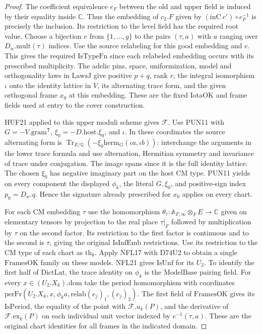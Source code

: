 \begin{proof}
The coefficient equivalence $e_F$ between the old and upper field
is induced by their equality inside $\mathbb C$. Thus the embedding
of $c_2.F$ given by $(\mathrm{inC}\ c')\circ e_F^{-1}$ is precisely
the inclusion. Its restriction to the level field has the required
root value. Choose a bijection $e$ from $\{1,\ldots,g\}$ to the
pairs $(\tau,a)$ with $a$ ranging over $D_w.\mathrm{mult}(\tau)$
indices. Use the source relabeling for this good embedding and $e$. This gives
the required $\mathrm{IsTypeFn}$ since each relabeled embedding
occurs with its prescribed multiplicity.
The adelic pins, space, uniformization, model and orthogonality laws in $\mathrm{LawsJ}$ give positive
$p+q$, rank $r$, the integral isomorphism $\iota$ onto the identity
lattice in $V$, its alternating trace form, and the given orthogonal
frame $x_0$ at this embedding. These are the fixed
$\mathrm{IotaOK}$ and frame fields used at entry to the cover
construction.

HUF21 applied to this upper moduli scheme gives $\mathcal F$.
Use PUN11 with $G=-V.\mathrm{gram}^{\mathsf T}$,
$\xi_0=-D.\mathrm{host}.\xi_0$, and $\iota$.
In these coordinates the source alternating form is
$\operatorname{Tr}_{E/\mathbb Q}(-\xi_0\mathrm{herm}_G(\iota a,\iota b))$:
interchange the arguments in the lower trace formula and use
alternation, Hermitian symmetry and invariance of trace under
conjugation. The image spans since it is the full identity lattice.
The chosen $\xi_0$ has negative imaginary part on the host CM type.
PUN11 yields on every component the displayed $\phi_k$, the literal
$G,\xi_0$, and positive-sign index $p_0=D_w.q$. Hence the
signature already prescribed for $x_0$ applies on every chart.

For each CM embedding $\tau$ use the homomorphism
$\theta_\tau:\mathbb A_{F,\infty}\otimes_F E\to\mathbb C$
given on elementary tensors by projection to the real place
$\tau|_F$ followed by multiplication by $\tau$ on the second
factor. Its restriction to the first factor is continuous and to the second is $\tau$, giving the original $\mathrm{IsInfEmb}$ restrictions.
Use its restriction to the CM type of each chart as $\mathrm{th}_k$.
Apply NFL17 with D74U2 to obtain a single $\mathrm{FramesOK}$ family
on these models. NFL21 gives $\mathrm{IsUnf}$ for its $U_2$. To
identify the first half of $\mathrm{DictLat}$, the trace identity on
$\phi_k$ is the $\mathrm{ModelBase}$ pairing field. For every
$x\in (U_2.X_k).\mathrm{dom}$ take the period homomorphism with
coordinates $\mathrm{perFr}(U_2.X_k,x,\phi_k a,\mathrm{relab}(e_j)_1,
(e_j)_2)$. The first field of $\mathrm{FramesOK}$ gives its
$\mathrm{IsPeriod}$, the equality of the point with $\mathcal F.u_k(P)$,
and the derivative of $\mathcal F.\mathrm{ex}_k(P)$ on each individual
unit vector indexed by $e^{-1}(\tau,a)$. These are the original
chart identities for all frames in the indicated domain.
\end{proof}

